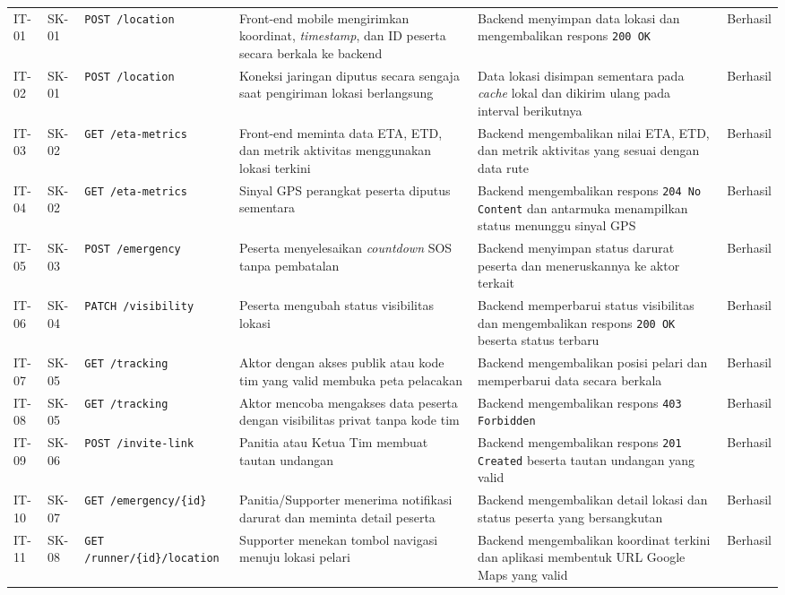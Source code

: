\begin{longtable}{p{1.3cm} p{1.6cm} p{3cm} p{4.3cm} p{3cm} p{1.5cm}}
IT-01 & SK-01 & \texttt{POST /location} & Front-end mobile mengirimkan koordinat, \textit{timestamp}, dan ID peserta secara berkala ke backend & Backend menyimpan data lokasi dan mengembalikan respons \texttt{200 OK} & Berhasil \\
IT-02 & SK-01 & \texttt{POST /location} & Koneksi jaringan diputus secara sengaja saat pengiriman lokasi berlangsung & Data lokasi disimpan sementara pada \textit{cache} lokal dan dikirim ulang pada interval berikutnya & Berhasil \\
IT-03 & SK-02 & \texttt{GET /eta-metrics} & Front-end meminta data ETA, ETD, dan metrik aktivitas menggunakan lokasi terkini & Backend mengembalikan nilai ETA, ETD, dan metrik aktivitas yang sesuai dengan data rute & Berhasil \\
IT-04 & SK-02 & \texttt{GET /eta-metrics} & Sinyal GPS perangkat peserta diputus sementara & Backend mengembalikan respons \texttt{204 No Content} dan antarmuka menampilkan status menunggu sinyal GPS & Berhasil \\
IT-05 & SK-03 & \texttt{POST /emergency} & Peserta menyelesaikan \textit{countdown} SOS tanpa pembatalan & Backend menyimpan status darurat peserta dan meneruskannya ke aktor terkait & Berhasil \\
IT-06 & SK-04 & \texttt{PATCH /visibility} & Peserta mengubah status visibilitas lokasi & Backend memperbarui status visibilitas dan mengembalikan respons \texttt{200 OK} beserta status terbaru & Berhasil \\
IT-07 & SK-05 & \texttt{GET /tracking} & Aktor dengan akses publik atau kode tim yang valid membuka peta pelacakan & Backend mengembalikan posisi pelari dan memperbarui data secara berkala & Berhasil \\
IT-08 & SK-05 & \texttt{GET /tracking} & Aktor mencoba mengakses data peserta dengan visibilitas privat tanpa kode tim & Backend mengembalikan respons \texttt{403 Forbidden} & Berhasil \\
IT-09 & SK-06 & \texttt{POST /invite-link} & Panitia atau Ketua Tim membuat tautan undangan & Backend mengembalikan respons \texttt{201 Created} beserta tautan undangan yang valid & Berhasil \\
IT-10 & SK-07 & \texttt{GET /emergency/\{id\}} & Panitia/Supporter menerima notifikasi darurat dan meminta detail peserta & Backend mengembalikan detail lokasi dan status peserta yang bersangkutan & Berhasil \\
IT-11 & SK-08 & \texttt{GET /runner/\{id\}/location} & Supporter menekan tombol navigasi menuju lokasi pelari & Backend mengembalikan koordinat terkini dan aplikasi membentuk URL Google Maps yang valid & Berhasil \\

\end{longtable}
